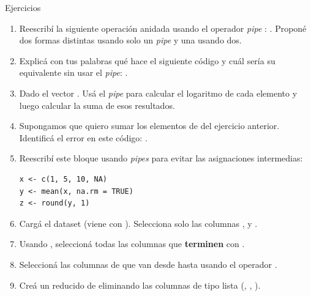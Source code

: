 \documentclass[8pt]{beamer}
\begin{document}
\begin{frame}[fragile]{Ejercicios}
	\begin{enumerate}
		\item Reescrib\'i la siguiente operación anidada usando el operador \textit{pipe} \rscript{|>}: . Proponé dos formas distintas usando solo un \textit{pipe} y una usando dos.
		
		\item Explic\'a con tus palabras qué hace el siguiente código y cuál sería su equivalente sin usar el \textit{pipe}: .
		
		\item Dado el vector . Us\'a el \textit{pipe} para calcular el logaritmo de cada elemento y luego calcular la suma de esos resultados.
		
		\item Supongamos que quiero sumar los elementos de  del ejercicio anterior. Identific\'a el error en este código: .
		
		\item Reescrib\'i este bloque usando \textit{pipes} para evitar las asignaciones intermedias:
\begin{lstlisting}[style=RScript]
x <- c(1, 5, 10, NA)
y <- mean(x, na.rm = TRUE)
z <- round(y, 1)
\end{lstlisting}

		\item Carg\'a el dataset  (viene con ). Selecciona solo las columnas ,  y .
		
		\item Usando , seleccion\'a todas las columnas que \textbf{terminen} con  .
		
		\item Seleccion\'a las columnas de  que van desde  hasta  usando el operador \rscript{:}.
		
		\item Cre\'a un  reducido de  eliminando las columnas de tipo lista (, , ).
	\end{enumerate}
\end{frame}
\end{document}
